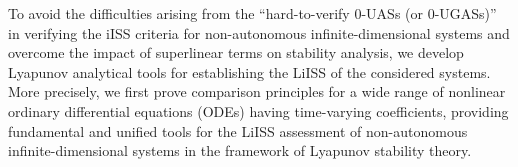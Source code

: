 \documentclass[onecolumn]{autart}
\newenvironment{proof of Prop.ODE}{{\it Proof of Proposition~\ref{Prop.ODE}:\enspace}}{\hfill $\blacksquare$\par}
\newenvironment{proof of PDE}{{\it Proof of Proposition \ref{Prop.8}:\enspace}}{\hfill $\blacksquare$\par}
\begin{document}
{	
	To avoid the difficulties arising from the ``hard-to-verify {0-UASs (or 0-UGASs)}'' in verifying  the iISS criteria for non-autonomous infinite-dimensional systems  and   overcome the impact of superlinear terms on stability analysis, we develop Lyapunov analytical tools for  establishing the  LiISS  of the considered systems.
	More
	precisely, we first prove     comparison principles for a wide range  of nonlinear ordinary differential equations (ODEs)  having   time-varying coefficients, providing   fundamental and unified tools for the LiISS assessment of non-autonomous infinite-dimensional systems in the framework of  Lyapunov stability theory.
}
\end{document}
